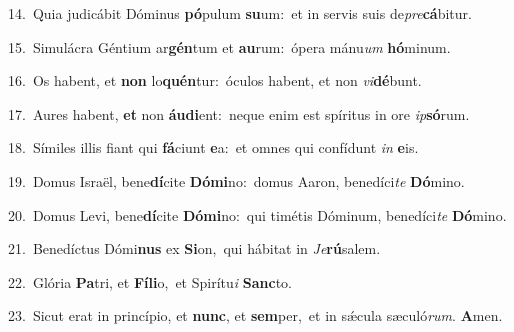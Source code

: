 {\numbfont\textcolor{\numbcolor}{14.}}~Quia judicábit Dóminus \textbf{pó}\-pulum \textbf{su}\-um:~\star et in servis suis de\-\textit{pre}\-\textbf{cá}bitur.\par
{\numbfont\textcolor{\numbcolor}{15.}}~Simulácra Géntium ar\-\textbf{gén}\-tum et \textbf{au}\-rum:~\star ópera mánu\textit{um} \textbf{hó}\-minum.\par
{\numbfont\textcolor{\numbcolor}{16.}}~Os habent, et \textbf{non} lo\-\textbf{quén}\-tur:~\star óculos habent, et non \textit{vi}\-\textbf{dé}bunt.\par
{\numbfont\textcolor{\numbcolor}{17.}}~Aures habent, \textbf{et} non \textbf{áu}\-\textbf{di}ent:~\star neque enim est spíritus in ore \textit{ip}\-\textbf{só}rum.\par
{\numbfont\textcolor{\numbcolor}{18.}}~Símiles illis fiant qui \textbf{fá}\-ciunt \textbf{e}\-a:~\star et omnes qui confídunt \textit{in} \textbf{e}\-is.\par
{\numbfont\textcolor{\numbcolor}{19.}}~Domus Israël, bene\-\textbf{dí}\-cite \textbf{Dó}\-\textbf{mi}no:~\star domus Aaron, benedíci\textit{te} \textbf{Dó}\-mino.\par
{\numbfont\textcolor{\numbcolor}{20.}}~Domus Levi, bene\-\textbf{dí}\-cite \textbf{Dó}\-\textbf{mi}no:~\star qui timétis Dóminum, benedíci\textit{te} \textbf{Dó}\-mino.\par
{\numbfont\textcolor{\numbcolor}{21.}}~Benedíctus Dómi\textbf{nus} ex \textbf{Si}\-on,~\star qui hábitat in \textit{Je}\-\textbf{rú}salem.\par
{\numbfont\textcolor{\numbcolor}{22.}}~Glória \textbf{Pa}\-tri, et \textbf{Fí}\-\textbf{li}o,~\star et Spirítu\textit{i} \textbf{Sanc}\-to.\par
{\numbfont\textcolor{\numbcolor}{23.}}~Sicut erat in princípio, et \textbf{nunc}\-, et \textbf{sem}\-per,~\star et in sǽcula sæculó\-\textit{rum}\-. \textbf{A}\-men.\par
